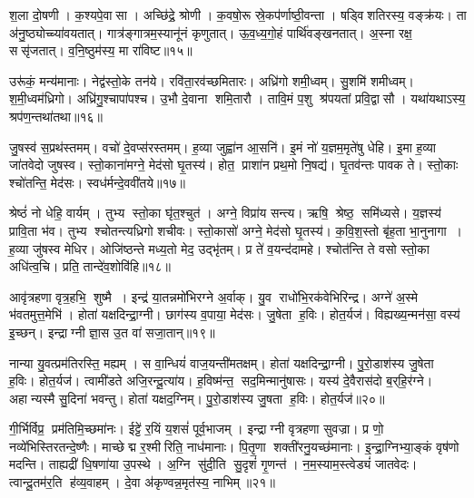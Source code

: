 श॒ला दो॒षणी।
क॒श्यपे॒वासा।
अच्छि॑द्रे॒ श्रोणी।
क॒वषो॒रू स्रे॒कप॑र्णाष्ठी॒वन्ता।
षड्विशतिरस्य॒ वङ्क्र॑यः।
ता अ॑नु॒ष्ठ्योच्च्या॑वयतात्।
गात्र॑ङ्गात्रम॒स्यानू॑नं कृणुतात्।
ऊ॒व॒ध्य॒गो॒हं पार्थि॑वङ्खनतात्।
अ॒स्ना रक्ष॒ ससृ॑जतात्।
व॒नि॒ष्ठुम॑स्य॒ मा रा॑विष्ट॥१५॥

उरू॑कं॒ मन्य॑मानाः।
नेद्व॑स्तो॒के तन॑ये।
रवि॑ता॒रव॑च्छमितारः।
अध्रि॑गो शमी॒ध्वम्।
सु॒शमि॑ शमीध्वम्।
श॒मी॒ध्वम॑ध्रिगो।
अध्रि॑गु॒श्चापा॑पश्च।
उ॒भौ दे॒वाना शमि॒तारौ।
तावि॒मं प॒शु श्र॑पयतां प्रवि॒द्वासौ।
यथा॑यथाऽस्य॒ श्रप॑ण॒न्तथा॑तथा॥१६॥\anuvakamend[ध॒त्ता॒द्बा॒हू मा रा॑विष्ट॒ तथा॑तथा]

जु॒षस्व॑ स॒प्रथ॑स्तमम्।
वचो॑ दे॒वप्स॑रस्तमम्।
ह॒व्या जुह्वा॑न आ॒सनि॑।
इ॒मं नो॑ य॒ज्ञम॒मृते॑षु धेहि।
इ॒मा ह॒व्या जा॑तवेदो जुषस्व।
स्तो॒काना॑मग्ने॒ मेद॑सो घृ॒तस्य॑।
होत॒ प्राशा॑न प्रथ॒मो नि॒षद्य॑।
घृ॒तव॑न्तः पावक ते।
स्तो॒काः श्चो॑तन्ति॒ मेद॑सः।
स्वध॑र्मन्दे॒ववी॑तये॥१७॥

श्रेष्ठं॑ नो धेहि॒ वार्यम्।
तुभ्य स्तो॒का घृ॑त॒श्चुत॑।
अग्ने॒ विप्रा॑य सन्त्य।
ऋषि॒ श्रेष्ठ॒ समि॑ध्यसे।
य॒ज्ञस्य॑ प्रावि॒ता भ॑व।
तुभ्य श्चोतन्त्यध्रिगो शचीवः।
स्तो॒कासो॑ अग्ने॒ मेद॑सो घृ॒तस्य॑।
क॒वि॒श॒स्तो बृ॑ह॒ता भा॒नुनागा।
ह॒व्या जु॑षस्व मेधिर।
ओजि॑ष्ठन्ते मध्य॒तो मेद॒ उद्भृ॑तम्।
प्र ते॑ व॒यन्द॑दामहे।
श्चोत॑न्ति ते वसो स्तो॒का अधि॑त्व॒चि।
प्रति॒ तान्दे॑व॒शोवि॑हि॥१८॥\anuvakamend[दे॒ववी॑तय॒ उद्भृ॑त॒न्त्रीणि॑ च]

आवृ॑त्रहणा वृत्र॒हभि॒ शुष्मै।
इन्द्र॑ या॒तन्नमो॑भिरग्ने अ॒र्वाक्।
यु॒व राधो॑भि॒रक॑वेभिरिन्द्र।
अग्ने॑ अ॒स्मे भ॑वतमुत्त॒मेभि॑।
होता॑ यक्षदिन्द्रा॒ग्नी।
छाग॑स्य व॒पाया॒ मेद॑सः।
जु॒षेता ह॒विः।
होत॒र्यज॑।
विह्यख्य॒न्मन॑सा॒ वस्य॑ इ॒च्छन्।
इन्द्राग्नी ज्ञा॒स उ॒त वा॑ सजा॒तान्॥१९॥

नान्या यु॒वत्प्रम॑तिरस्ति॒ मह्यम्।
स वा॒न्धियं॑ वाज॒यन्ती॑मतक्षम्।
होता॑ यक्षदिन्द्रा॒ग्नी।
पु॒रो॒डाश॑स्य जु॒षेता ह॒विः।
होत॒र्यज॑।
त्वामी॑डते अजि॒रन्दू॒त्या॑य।
ह॒विष्म॑न्त॒ सद॒मिन्मानु॑षासः।
यस्य॑ दे॒वैरास॑दो ब॒र्‌हि॒र॑ग्ने।
अहान्यस्मै सु॒दिना॑ भवन्तु।
होता॑ यक्षद॒ग्निम्।
पु॒रो॒डाश॑स्य जु॒षता ह॒विः।
होत॒र्यज॑॥२०॥\anuvakamend[स॒जा॒तान॒ग्निन्द्वे च॑]

गी॒र्भिर्विप्र॒ प्रम॑तिमि॒च्छमा॑नः।
ईट्टे॑ र॒यिं य॒शसं॑ पूर्व॒भाजम्।
इन्द्राग्नी वृत्रहणा सुवज्रा।
प्र णो॒ नव्ये॑भिस्तिरतन्दे॒ष्णैः।
माच्छेद्म र॒श्मीरिति॒ नाध॑मानाः।
पि॒तृ॒णा शक्ती॑रनु॒यच्छ॑मानाः।
इ॒न्द्रा॒ग्निभ्या॒ङ्कं वृष॑णो मदन्ति।
ताह्यद्री॑ धि॒षणा॑या उ॒पस्थे।
अ॒ग्नि सु॑दी॒ति सु॒दृशं॑ गृ॒णन्त॑।
न॒म॒स्याम॒स्त्वेड्यं॑ जातवेदः।
त्वान्दू॒तम॑र॒ति ह॑व्य॒वाहम्।
दे॒वा अ॑कृण्वन्न॒मृत॑स्य॒ नाभिम्॥२१॥\anuvakamend[जा॒त॒वे॒दो॒ द्वे च॑]

